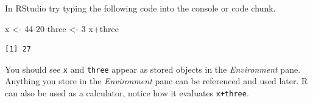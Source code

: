 \documentclass[
  letterpaper,
  DIV=11,
  numbers=noendperiod]{scrreprt}
\newenvironment{Shaded}{\begin{snugshade}}{\end{snugshade}}
\newcommand{\DecValTok}[1]{\textcolor[rgb]{0.68,0.00,0.00}{#1}}
\newcommand{\NormalTok}[1]{\textcolor[rgb]{0.00,0.23,0.31}{#1}}
\newcommand{\OtherTok}[1]{\textcolor[rgb]{0.00,0.23,0.31}{#1}}
\newcommand{\SpecialCharTok}[1]{\textcolor[rgb]{0.37,0.37,0.37}{#1}}
\theoremstyle{definition}
\theoremstyle{remark}
\begin{document}
In RStudio try typing the following code into the console or code chunk.

\begin{Shaded}
\begin{Highlighting}[]
\NormalTok{x }\OtherTok{\textless{}{-}} \DecValTok{44{-}20}
\NormalTok{three }\OtherTok{\textless{}{-}} \DecValTok{3}
\NormalTok{x}\SpecialCharTok{+}\NormalTok{three}
\end{Highlighting}
\end{Shaded}

\begin{verbatim}
[1] 27
\end{verbatim}

You should see \texttt{x} and \texttt{three} appear as stored objects in
the \emph{Environment} pane. Anything you store in the
\emph{Environment} pane can be referenced and used later. R can also be
used as a calculator, notice how it evaluates \texttt{x+three}.
\end{document}
